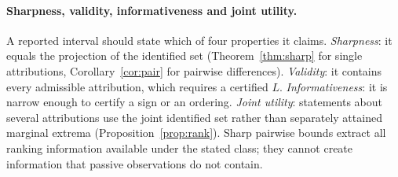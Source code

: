 \paragraph{Sharpness, validity, informativeness and joint utility.}
A reported interval should state which of four properties it claims. \emph{Sharpness}: it equals the projection of the
identified set (Theorem~\ref{thm:sharp} for single attributions, Corollary~\ref{cor:pair} for pairwise differences).
\emph{Validity}: it contains every admissible attribution, which requires a certified $L$. \emph{Informativeness}: it is
narrow enough to certify a sign or an ordering. \emph{Joint utility}: statements about several attributions use the joint
identified set rather than separately attained marginal extrema (Proposition~\ref{prop:rank}). Sharp pairwise bounds
extract all ranking information available under the stated class; they cannot create information that passive
observations do not contain.
